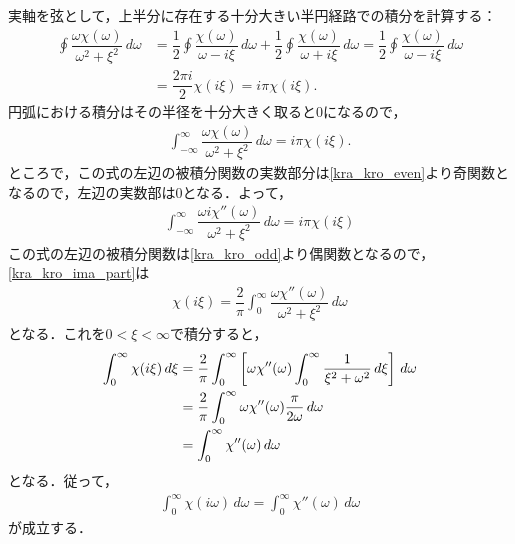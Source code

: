 \begin{center}
\end{center}

実軸を弦として，上半分に存在する十分大きい半円経路での積分を計算する：
\begin{align*}
  \oint \dfrac{\omega\chi(\omega)}{\omega^2+\xi^2} \, d\omega
  &= \dfrac{1}{2}\oint \dfrac{\chi(\omega)}{\omega - i\xi} \, d\omega + \dfrac{1}{2}\oint \dfrac{\chi(\omega)}{\omega+i\xi} \, d\omega
  = \dfrac{1}{2}\oint \dfrac{\chi(\omega)}{\omega - i\xi} \, d\omega \\
  &= \dfrac{2\pi i}{2} \chi(i\xi) = i \pi \chi(i\xi) .
\end{align*}
円弧における積分はその半径を十分大きく取ると0になるので，
\begin{align}
  \int_{ - \infty}^\infty \dfrac{\omega\chi(\omega)}{\omega^2+\xi^2} \, d\omega = i\pi\chi(i\xi) .
\end{align}
ところで，この式の左辺の被積分関数の実数部分は\eqref{kra_kro_even}より奇関数となるので，左辺の実数部は0となる．よって，
\begin{align}
  \int_{ - \infty}^\infty \dfrac{\omega{}i\chi''(\omega)}{\omega^2+\xi^2} \, d\omega = i\pi\chi(i\xi) \label{kra_kro_ima_part}
\end{align}
この式の左辺の被積分関数は\eqref{kra_kro_odd}より偶関数となるので，\eqref{kra_kro_ima_part}は
\begin{align}
  \chi(i\xi) = \dfrac{2}{\pi}\int^\infty_0 \dfrac{\omega\chi''(\omega)}{\omega^2+\xi^2} \, d\omega
\end{align}
となる．これを$0 < \xi < \infty$で積分すると，
\begin{align}
  \int^\infty_0 \chi(i\xi) \, d\xi &= \dfrac{2}{\pi}\int^\infty_0\left[\omega\chi''(\omega)\int^\infty_0 \dfrac{1}{\xi^2+\omega^2} \, d\xi\right] \, d\omega\notag \\
  &= \dfrac{2}{\pi}\int_0^\infty\omega\chi''(\omega)\dfrac{\pi}{2\omega} \, d\omega\notag \\
  &= \int^\infty_0\chi''(\omega) \, d\omega
\end{align}
となる．従って，
\begin{align}
  \int^\infty_0 \chi(i\omega) \, d\omega = \int^\infty_0\chi''(\omega) \, d\omega
\end{align}
が成立する．

